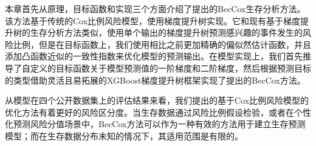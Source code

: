 本章首先从原理，目标函数和实现三个方面介绍了提出的BecCox生存分析方法。该方法基于传统的Cox比例风险模型，使用梯度提升树实现。它和现有基于梯度提升树的生存分析方法类似，使用单个输出的梯度提升树预测感兴趣的事件发生的风险比例，但是在目标函数上，我们使用相比之前更加精确的偏似然估计函数，并且添加凸函数近似的一致性指数来优化模型的预测输出。在模型实现上，我们首先推导了自定义的目标函数关于模型预测值的一阶梯度和二阶梯度，然后根据预测目标的类型借助灵活且易拓展的XGBoost梯度提升树框架实现了提出的BecCox方法。

从模型在四个公开数据集上的评估结果来看，我们提出的基于Cox比例风险模型的优化方法有着更好的风险区分度。当生存数据通过风险比例假设检验，或者在个性化预测风险分值场景中，BecCox方法可以作为一种有效的方法用于建立生存预测模型；而在生存数据分布未知的情况下，其适用范围是有限的。
